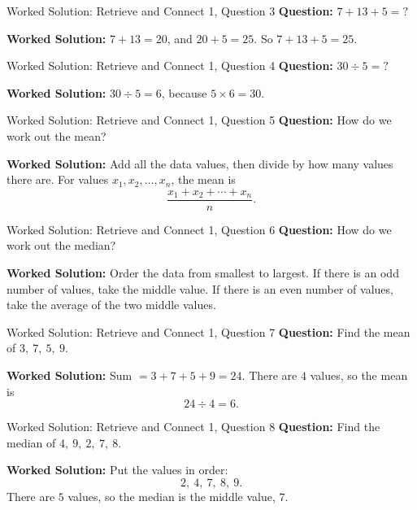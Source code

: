 \documentclass{beamer}
\begin{document}
\begin{frame}{Worked Solution: Retrieve and Connect 1, Question 3}
\small
\textbf{Question:} \(7+13+5=\mathord{?}\)

\smallskip
\textbf{Worked Solution:} \(7+13=20\), and \(20+5=25\). So \(7+13+5=25\).
\end{frame}

\begin{frame}{Worked Solution: Retrieve and Connect 1, Question 4}
\small
\textbf{Question:} \(30 \div 5=\mathord{?}\)

\smallskip
\textbf{Worked Solution:} \(30 \div 5 = 6\), because \(5 \times 6 = 30\).
\end{frame}

\begin{frame}{Worked Solution: Retrieve and Connect 1, Question 5}
\small
\textbf{Question:} How do we work out the mean?

\smallskip
\textbf{Worked Solution:} Add all the data values, then divide by how many values there are. For values \(x_1,x_2,\dots,x_n\), the mean is
\[
\frac{x_1+x_2+\cdots+x_n}{n}.
\]
\end{frame}

\begin{frame}{Worked Solution: Retrieve and Connect 1, Question 6}
\small
\textbf{Question:} How do we work out the median?

\smallskip
\textbf{Worked Solution:} Order the data from smallest to largest. If there is an odd number of values, take the middle value. If there is an even number of values, take the average of the two middle values.
\end{frame}

\begin{frame}{Worked Solution: Retrieve and Connect 1, Question 7}
\small
\textbf{Question:} Find the mean of \(3,\ 7,\ 5,\ 9\).

\smallskip
\textbf{Worked Solution:} Sum \(=3+7+5+9=24\). There are \(4\) values, so the mean is
\[
24 \div 4 = 6.
\]
\end{frame}

\begin{frame}{Worked Solution: Retrieve and Connect 1, Question 8}
\small
\textbf{Question:} Find the median of \(4,\ 9,\ 2,\ 7,\ 8\).

\smallskip
\textbf{Worked Solution:} Put the values in order:
\[
2,\ 4,\ 7,\ 8,\ 9.
\]
There are \(5\) values, so the median is the middle value, \(7\).
\end{frame}
\end{document}
